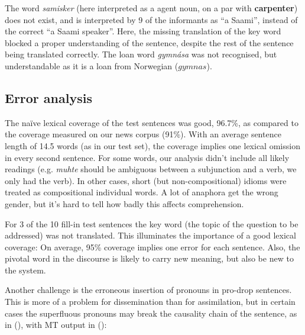 \documentclass{book}
\begin{document}

The word \textit{samisker} (here interpreted as a agent noun, on a par
with \textbf{carpenter}) does not exist, and is interpreted by 9 of
the informants as ``a Saami'', instead of the correct ``a Saami speaker''.
Here, the missing translation of the key word blocked a proper
understanding of the sentence, despite the rest of the sentence being
translated correctly. The loan word \textit{gymn\'{a}sa} was not
recognised, but understandable as it is a loan from Norwegian
($gymnas$).



\subsection{Error analysis}



The na\"{i}ve lexical coverage of the test sentences was good, 96.7\%,
as compared to the coverage measured on our news corpus (91\%). With
an average sentence length of 14.5 words (as in our test set), the
coverage implies one lexical omission in every second sentence. For
some words, our analysis didn't include all likely readings (e.g.
\textit{muhte} should be ambiguous between a subjunction and a verb,
we only had the verb). In other cases, short (but non-compositional)
idioms were treated as compositional individual words. A lot of
anaphora get the wrong gender, but it's hard to tell how badly this
affects comprehension.

For 3 of the 10 fill-in test sentences the key word (the topic of
the question to be addressed) was not translated. This illuminates
the importance of a good lexical coverage: On average, 95\% coverage implies
one error for each sentence. Also, the pivotal word in the discourse
is likely to carry new meaning, but also be new to
the system. 

Another challenge is the erroneous insertion of pronouns in pro-drop
sentences. This is more of a problem for dissemination than for
assimilation, but in certain cases the superfluous pronouns may break
the causality chain of the sentence, as in (), with \nob{} MT
output in ():
\end{document}
